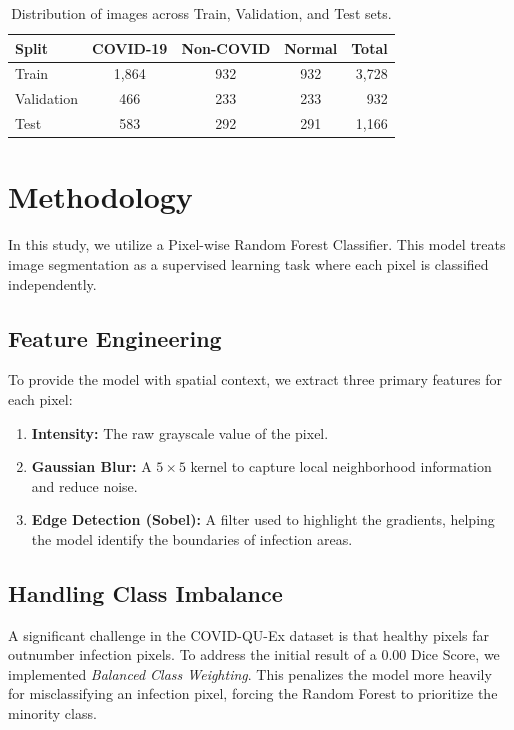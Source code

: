 \documentclass{article}
\begin{document}
\begin{table}[h]
    \centering
    \begin{tabular}{|l|c|c|c|r|}
    \hline
    \textbf{Split} & \textbf{COVID-19} & \textbf{Non-COVID} & \textbf{Normal} & \textbf{Total} \\ \hline
    Train & 1,864 & 932 & 932 & 3,728 \\ \hline
    Validation & 466 & 233 & 233 & 932 \\ \hline
    Test & 583 & 292 & 291 & 1,166 \\ \hline
    \end{tabular}
    \caption{Distribution of images across Train, Validation, and Test sets.}
    \label{tab:distribution}
\end{table}

\section{Methodology}
In this study, we utilize a Pixel-wise Random Forest Classifier. This model treats image segmentation as a supervised learning task where each pixel is classified independently.

\subsection{Feature Engineering}
To provide the model with spatial context, we extract three primary features for each pixel:
\begin{enumerate}
    \item \textbf{Intensity:} The raw grayscale value of the pixel.
    \item \textbf{Gaussian Blur:} A $5 \times 5$ kernel to capture local neighborhood information and reduce noise.
    \item \textbf{Edge Detection (Sobel):} A filter used to highlight the gradients, helping the model identify the boundaries of infection areas.
\end{enumerate}

\subsection{Handling Class Imbalance}
A significant challenge in the COVID-QU-Ex dataset is that healthy pixels far outnumber infection pixels. To address the initial result of a 0.00 Dice Score, we implemented \textit{Balanced Class Weighting}. This penalizes the model more heavily for misclassifying an infection pixel, forcing the Random Forest to prioritize the minority class.
\end{document}
